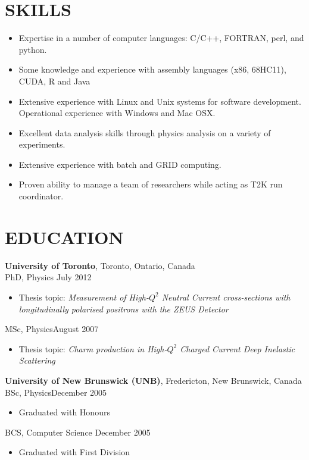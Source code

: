 \documentclass[margin]{res}
\begin{document}
\begin{resume}
\section{SKILLS}
\begin{itemize}
  \item Expertise in a number of computer languages: C/C++, FORTRAN, perl, and python.
  \item Some knowledge and experience with assembly languages (x86, 68HC11), CUDA, R and Java
  \item Extensive experience with Linux and Unix systems for software development. Operational experience with Windows and Mac OSX.
  \item Excellent data analysis skills through physics analysis on a variety of experiments. 
  \item Extensive experience with batch and GRID computing.
  \item Proven ability to manage a team of researchers while acting as T2K run coordinator.
\end{itemize}

\section{EDUCATION}

{\bf University of Toronto}, Toronto, Ontario, Canada \\
PhD, Physics \hfill July 2012
\begin{itemize} \itemsep -2pt  %
\item Thesis topic: \textit{Measurement of High-$Q^2$ Neutral Current cross-sections with longitudinally polarised positrons with the ZEUS Detector}
\end{itemize}
MSc, Physics\hfill August 2007 
\begin{itemize} \itemsep -2pt  %
\item Thesis topic: \textit{Charm production in High-$Q^2$ Charged Current Deep Inelastic Scattering}
\end{itemize}
{\bf University of New Brunswick (UNB)}, Fredericton, New Brunswick, Canada \\
BSc, Physics\hfill December 2005
\begin{itemize} \itemsep -2pt  %
\item Graduated with Honours 
\end{itemize}
BCS, Computer Science \hfill December 2005
\begin{itemize} \itemsep -2pt  %
\item Graduated with First Division 
\end{itemize}


\end{resume}
\end{document}
